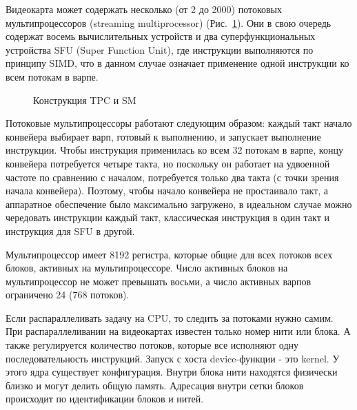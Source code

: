 \documentclass[a4paper,14pt,russian]{extreport}
\begin{document}
\par Видеокарта может содержать несколько (от 2 до 2000) потоковых мультипроцессоров (streaming multiprocessor) (Рис.~\ref{ris:tpc}). Они в свою очередь содержат восемь вычислительных устройств и два суперфункциональных устройства SFU (Super Function Unit), где инструкции выполняются по принципу SIMD, что в данном случае означает применение одной инструкции ко всем потокам в варпе.
\par
  \begin{figure}[h]
  \caption{Конструкция TPC и SM}
  \label{ris:tpc}
  \end{figure}
\par Потоковые мультипроцессоры работают следующим образом: каждый такт начало конвейера выбирает варп, готовый к выполнению, и запускает выполнение инструкции. Чтобы инструкция применилась ко всем 32 потокам в варпе, концу конвейера потребуется четыре такта, но поскольку он работает на удвоенной частоте по сравнению с началом, потребуется только два такта (с точки зрения начала конвейера). Поэтому, чтобы начало конвейера не простаивало такт, а аппаратное обеспечение было максимально загружено, в идеальном случае можно чередовать инструкции каждый такт, классическая инструкция в один такт и инструкция для SFU в другой.
\par Мультипроцессор имеет 8192 регистра, которые общие для всех потоков всех блоков, активных на мультипроцессоре. Число активных блоков на мультипроцессор не может превышать восьми, а число активных варпов ограничено 24 (768 потоков).
\par Если распараллеливать задачу на CPU, то следить за потоками нужно самим. При распараллеливании на видеокартах известен только номер нити или блока. А также регулируется количество потоков, которые все исполняют одну последовательность инструкций. Запуск с хоста device-функции - это kernel. У этого ядра существует конфигурация. Внутри блока нити находятся физически близко и могут делить общую память. Адресация внутри сетки блоков происходит по идентификации блоков и нитей.
\end{document}
